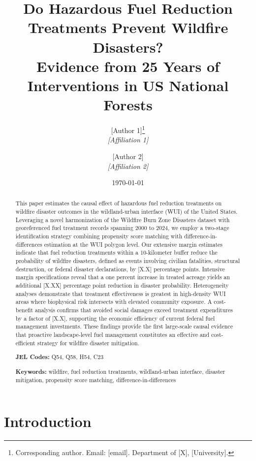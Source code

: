 \documentclass[12pt, letterpaper]{article}
\title{\textbf{Do Hazardous Fuel Reduction Treatments Prevent Wildfire Disasters?\\[0.3em] Evidence from 25 Years of Interventions in US National Forests}}
\author{
    [Author 1]\thanks{Corresponding author. Email: [email]. Department of [X], [University].} \\
    \textit{[Affiliation 1]}
    \and
    [Author 2] \\
    \textit{[Affiliation 2]}
}
\date{\today}
\begin{document}
\maketitle
\thispagestyle{empty}

\begin{abstract}
\noindent
This paper estimates the causal effect of hazardous fuel reduction treatments on wildfire disaster outcomes in the wildland-urban interface (WUI) of the United States. Leveraging a novel harmonization of the Wildfire Burn Zone Disasters dataset with georeferenced fuel treatment records spanning 2000 to 2024, we employ a two-stage identification strategy combining propensity score matching with difference-in-differences estimation at the WUI polygon level. Our extensive margin estimates indicate that fuel reduction treatments within a 10-kilometer buffer reduce the probability of wildfire disasters, defined as events involving civilian fatalities, structural destruction, or federal disaster declarations, by [X.X] percentage points. Intensive margin specifications reveal that a one percent increase in treated acreage yields an additional [X.XX] percentage point reduction in disaster probability. Heterogeneity analyses demonstrate that treatment effectiveness is greatest in high-density WUI areas where biophysical risk intersects with elevated community exposure. A cost-benefit analysis confirms that avoided social damages exceed treatment expenditures by a factor of [X.X], supporting the economic efficiency of current federal fuel management investments. These findings provide the first large-scale causal evidence that proactive landscape-level fuel management constitutes an effective and cost-efficient strategy for wildfire disaster mitigation.

\bigskip
\noindent \textbf{JEL Codes:} Q54, Q58, H54, C23

\noindent \textbf{Keywords:} wildfire, fuel reduction treatments, wildland-urban interface, disaster mitigation, propensity score matching, difference-in-differences
\end{abstract}

\newpage
\setcounter{page}{1}

\section{Introduction}
\end{document}
